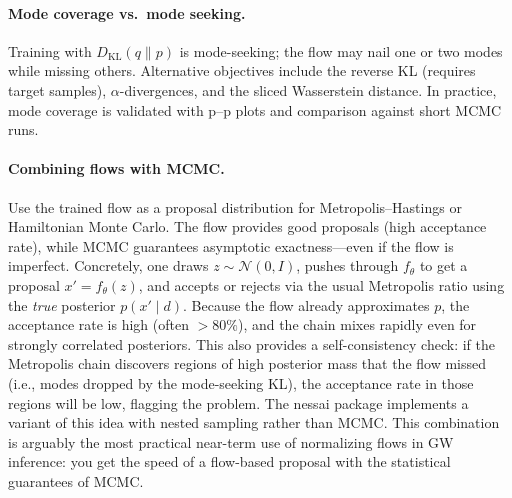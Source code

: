 \documentclass[11pt,letterpaper]{article}
\begin{document}
\paragraph{Mode coverage vs.\ mode seeking.}
Training with $D_\mathrm{KL}(q \| p)$ is mode-seeking; the flow
may nail one or two modes while missing others.
Alternative objectives include the reverse KL (requires target
samples), $\alpha$-divergences, and the sliced Wasserstein distance.
In practice, mode coverage is validated with p--p plots and
comparison against short MCMC runs.

\paragraph{Combining flows with MCMC.}
Use the trained flow as a proposal distribution for
Metropolis--Hastings or Hamiltonian Monte Carlo.
The flow provides good proposals (high acceptance rate), while
MCMC guarantees asymptotic exactness---even if the flow is imperfect.
Concretely, one draws $z \sim \mathcal{N}(0,I)$, pushes through
$f_\theta$ to get a proposal $x' = f_\theta(z)$, and accepts or
rejects via the usual Metropolis ratio using the \emph{true} posterior
$p(x' \mid d)$.
Because the flow already approximates $p$, the acceptance rate is high
(often $> 80\%$), and the chain mixes rapidly even for strongly
correlated posteriors.
This also provides a self-consistency check: if the Metropolis chain
discovers regions of high posterior mass that the flow missed (i.e.,
modes dropped by the mode-seeking KL), the acceptance rate in those
regions will be low, flagging the problem.
The nessai package \cite{williams2021} implements a variant of this
idea with nested sampling rather than MCMC.
This combination is arguably the most practical near-term use of
normalizing flows in GW inference: you get the speed of a flow-based
proposal with the statistical guarantees of MCMC.
\end{document}
